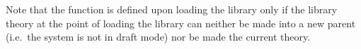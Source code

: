 Note that the function  is defined upon loading the
 library only if the library theory  at the
point of loading the library can neither be made into a new parent (i.e.\ the
system is not in draft mode) nor be made the current
theory.

